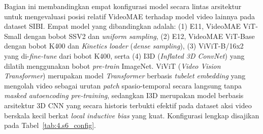 Bagian ini membandingkan empat konfigurasi model secara lintas arsitektur untuk mengevaluasi posisi relatif VideoMAE terhadap model video lainnya pada dataset SIBI. Empat model yang dibandingkan adalah: (1) E11, VideoMAE ViT-Small dengan bobot SSV2 dan \textit{uniform sampling}, (2) E12, VideoMAE ViT-Base dengan bobot K400 dan \textit{Kinetics loader} (\textit{dense sampling}), (3) ViViT-B/16x2 yang di-\textit{fine-tune} dari bobot K400, serta (4) I3D (\textit{Inflated 3D ConvNet}) yang dilatih menggunakan bobot \textit{pre-train} ImageNet. ViViT (\textit{Video Vision Transformer}) merupakan model \textit{Transformer} berbasis \textit{tubelet embedding} yang mengolah video sebagai urutan \textit{patch} spasio-temporal secara langsung tanpa \textit{masked autoencoding pre-training}, sedangkan I3D merupakan model berbasis arsitektur 3D CNN yang secara historis terbukti efektif pada dataset aksi video berskala kecil berkat \textit{local inductive bias} yang kuat. Konfigurasi lengkap disajikan pada Tabel~\ref{tab:4.s6_config}.\par
\par

